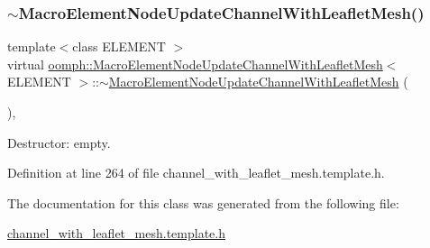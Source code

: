 \mbox{\label{classoomph_1_1MacroElementNodeUpdateChannelWithLeafletMesh_a5debbfa68133a5ad9bd621b24b2fd086}} 
\subsubsection{\texorpdfstring{$\sim$\+Macro\+Element\+Node\+Update\+Channel\+With\+Leaflet\+Mesh()}{~MacroElementNodeUpdateChannelWithLeafletMesh()}}
{\footnotesize\ttfamily template$<$class E\+L\+E\+M\+E\+NT $>$ \\
virtual \hyperlink{classoomph_1_1MacroElementNodeUpdateChannelWithLeafletMesh}{oomph\+::\+Macro\+Element\+Node\+Update\+Channel\+With\+Leaflet\+Mesh}$<$ E\+L\+E\+M\+E\+NT $>$\+::$\sim$\hyperlink{classoomph_1_1MacroElementNodeUpdateChannelWithLeafletMesh}{Macro\+Element\+Node\+Update\+Channel\+With\+Leaflet\+Mesh} (\begin{DoxyParamCaption}{ }\end{DoxyParamCaption})\hspace{0.3cm}{\ttfamily [inline]}, {\ttfamily [virtual]}}



Destructor\+: empty. 



Definition at line 264 of file channel\+\_\+with\+\_\+leaflet\+\_\+mesh.\+template.\+h.



The documentation for this class was generated from the following file\+:\begin{DoxyCompactItemize}
\item 
\hyperlink{channel__with__leaflet__mesh_8template_8h}{channel\+\_\+with\+\_\+leaflet\+\_\+mesh.\+template.\+h}\end{DoxyCompactItemize}
